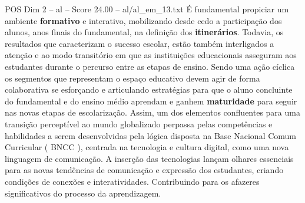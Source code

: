 \begin{textsample}{POS Dim 2 – al – Score 24.00 – al/al\_em\_13.txt}
É fundamental propiciar um ambiente \textbf{formativo} e interativo, mobilizando desde cedo a participação dos alunos, anos finais do fundamental, na definição dos \textbf{itinerários}.
Todavia, os resultados que caracterizam o sucesso escolar, estão também interligados a atenção e ao modo transitório em que as instituições educacionais asseguram aos estudantes durante o percurso entre as etapas de ensino.
Sendo uma ação cíclica os segmentos que representam o espaço educativo devem agir de forma colaborativa se esforçando e articulando estratégias para que o aluno concluinte do fundamental e do ensino médio aprendam e ganhem \textbf{maturidade} para seguir nas novas etapas de escolarização.
Assim, um dos elementos confluentes para uma transição perceptível ao mundo globalizado perpassa pelas competências e habilidades a serem desenvolvidas pela lógica disposta na Base Nacional Comum Curricular ( BNCC ), centrada na tecnologia e cultura digital, como uma nova linguagem de comunicação.
A inserção das tecnologias lançam olhares essenciais para as novas tendências de comunicação e expressão dos estudantes, criando condições de conexões e interatividades.
Contribuindo para os afazeres significativos do processo da aprendizagem.

\end{textsample}
